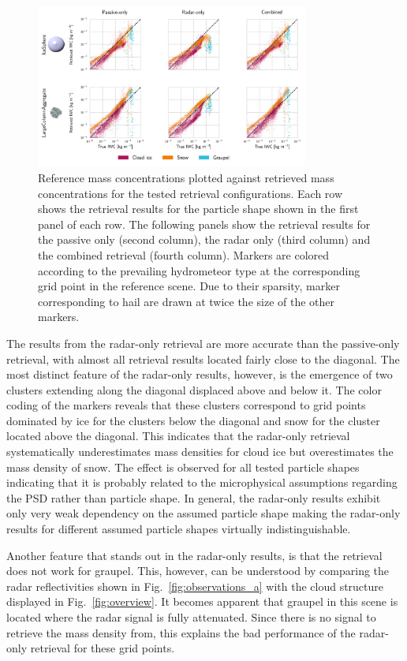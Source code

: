 \documentclass[journal abbreviation, manuscript]{copernicus}
\begin{document}
\begin{figure}
\centering
\includegraphics[width = 0.8\textwidth]{../plots/results_scatter_a_1}
\caption{Reference mass concentrations plotted against retrieved mass
  concentrations for the tested retrieval configurations. Each row shows the
  retrieval results for the particle shape shown in the first panel of each row.
  The following panels show the retrieval results for the passive only (second
  column), the radar only (third column) and the combined retrieval (fourth
  column). Markers are colored according to the prevailing hydrometeor type at
  the corresponding grid point in the reference scene. Due to their sparsity,
  marker corresponding to hail are drawn at twice the size of the other
  markers.}
\label{fig:results_scatter_a_1}
\end{figure}

The results from the radar-only retrieval are more accurate than the passive-only
retrieval, with almost all retrieval results located fairly close to the diagonal.
The most distinct feature of the radar-only results, however, is the emergence
of two clusters extending along the diagonal displaced above and below it. The
color coding of the markers reveals that these clusters correspond to grid
points dominated by ice for the clusters below the diagonal and snow for the
cluster located above the diagonal. This indicates that the radar-only retrieval
systematically underestimates mass densities for cloud ice but overestimates the
mass density of snow. The effect is observed for all tested particle shapes
indicating that it is probably related to the microphysical assumptions
regarding the PSD rather than particle shape. In general, the radar-only results
exhibit only very weak dependency on the assumed particle shape making the
radar-only results for different assumed particle shapes virtually
indistinguishable.

Another feature that stands out in the radar-only results, is that the retrieval
does not work for graupel. This, however, can be understood by comparing the
radar reflectivities shown in Fig.~\ref{fig:observations_a} with the cloud
structure displayed in Fig.~\ref{fig:overview}. It becomes apparent that graupel
in this scene is located where the radar signal is fully attenuated. Since there
is no signal to retrieve the mass density from, this explains the bad
performance of the radar-only retrieval for these grid points.
\end{document}
